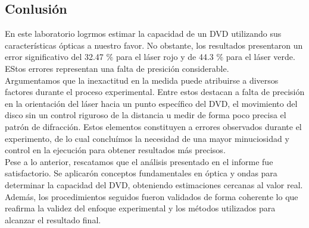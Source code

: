 \documentclass[10pt,a4paper]{article}
\begin{document}
\begin{multicols}{2}
	
\section{Conlusión}
En este laboratorio logrmos estimar la capacidad de un DVD utilizando sus características ópticas a nuestro favor. No obstante, los resultados presentaron un error significativo del 32.47 $\%$ para el láser rojo y de 44.3 $\%$ para el láser verde. EStos errores representan una falta de presición considerable.\\

Argumentamos que la inexactitud en la medida puede atribuirse a diversos factores durante el proceso experimental. Entre estos destacan a falta de precisión en la orientación del láser hacia un punto específico del DVD, el movimiento del disco sin un control riguroso de la distancia u medir de forma poco precisa el patrón de difracción. Estos elementos constituyen a errores observados durante el experimento, de lo cual concluímos la necesidad de una mayor minuciosidad y control en la ejecución para obtener resultados más precisos.\\

Pese a lo anterior, rescatamos que el análisis presentado en el informe fue satisfactorio. Se aplicarón conceptos fundamentales en óptica y ondas para determinar la capacidad del DVD, obteniendo estimaciones cercanas al valor real. Además, los procedimientos seguidos fueron validados de forma coherente lo que reafirma la validez del enfoque experimental y los métodos utilizados para alcanzar el resultado final.




	
	
	
	\end{multicols}
\end{document}
